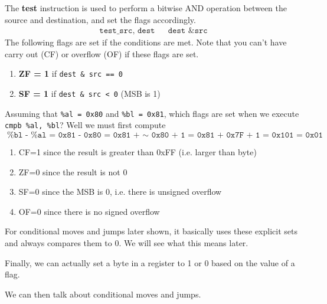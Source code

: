 \documentclass{article}
\begin{document}
  \begin{definition}[Test]
    The \textbf{test} instruction is used to perform a bitwise AND operation between the source and destination, and set the flags accordingly. 
    \begin{align*}
      \texttt{test\_ src, dest} && \texttt{dest \& src} 
    \end{align*}
    The following flags are set if the conditions are met. Note that you can't have carry out (CF) or overflow (OF) if these flags are set. 
    \begin{enumerate}
      \item \textbf{ZF = 1} if \texttt{dest \& src == 0} 
      \item \textbf{SF = 1} if \texttt{dest \& src < 0} (MSB is 1) 
    \end{enumerate}
  \end{definition}

  \begin{example}[Compare] 
    Assuming that \texttt{\%al = 0x80} and \texttt{\%bl = 0x81}, which flags are set when we execute \texttt{cmpb \%al, \%bl}? Well we must first compute 
    \begin{equation}
      \texttt{\%bl - \%al = 0x81 - 0x80 = 0x81 + $\sim$ 0x80 + 1 = 0x81 + 0x7F + 1 = 0x101 = 0x01}
    \end{equation}
    \begin{enumerate}
      \item CF=1 since the result is greater than 0xFF (i.e. larger than byte) 
      \item ZF=0 since the result is not 0 
      \item SF=0 since the MSB is 0, i.e. there is unsigned overflow
      \item OF=0 since there is no signed overflow
    \end{enumerate}
  \end{example}

  For conditional moves and jumps later shown, it basically uses these explicit sets and always compares them to $0$. We will see what this means later. 

  Finally, we can actually set a byte in a register to 1 or 0 based on the value of a flag. 

  \begin{definition}[Set]
    
  \end{definition}

  We can then talk about conditional moves and jumps.  
\end{document}
